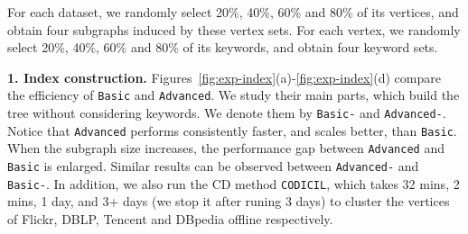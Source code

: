 For each dataset, we randomly select 20\%, 40\%, 60\% and 80\%
of its vertices, and obtain four subgraphs induced by these vertex sets.
For each vertex, we randomly select 20\%, 40\%, 60\% and 80\%
of its keywords, and obtain four keyword sets.

\textbf{1. Index construction.}
Figures~\ref{fig:exp-index}(a)-\ref{fig:exp-index}(d)
compare the efficiency of {\tt Basic} and {\tt Advanced}.
We study their main parts, which build the tree without considering keywords.
We denote them by {\tt Basic-} and {\tt Advanced-}.
Notice that {\tt Advanced} performs consistently faster, and scales better, than {\tt Basic}.
When the subgraph size increases, the performance gap between {\tt Advanced} and {\tt Basic} is enlarged.
Similar results can be observed between {\tt Advanced-} and {\tt Basic-}.
In addition, we also run the CD method {\tt CODICIL}, which takes 32 mins, 2 mins, 1 day, and 3+ days (we stop it after runing 3 days) to cluster the vertices of Flickr, DBLP, Tencent and DBpedia offline respectively.


